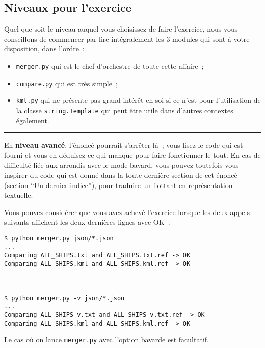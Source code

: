     \hypertarget{niveaux-pour-lexercice}{%
\subsection{Niveaux pour l'exercice}\label{niveaux-pour-lexercice}}

    Quel que soit le niveau auquel vous choisissez de faire l'exercice, nous
vous conseillons de commencer par lire intégralement les 3 modules qui
sont à votre disposition, dans l'ordre~:

\begin{itemize}
\tightlist
\item
  \texttt{merger.py} qui est le chef d'orchestre de toute cette
  affaire~;
\item
  \texttt{compare.py} qui est très simple~;
\item
  \texttt{kml.py} qui ne présente pas grand intérêt en soi si ce n'est
  pour l'utilisation de
  \href{https://docs.python.org/3/library/string.html\#template-strings}{la
  classe \texttt{string.Template}} qui peut être utile dans d'autres
  contextes également.
\end{itemize}

    \begin{center}\rule{0.5\linewidth}{\linethickness}\end{center}

    En \textbf{niveau avancé}, l'énoncé pourrait s'arrêter là~; vous lisez
le code qui est fourni et vous en déduisez ce qui manque pour faire
fonctionner le tout. En cas de difficulté liée aux arrondis avec le mode
bavard, vous pouvez toutefois vous inspirer du code qui est donné dans
la toute dernière section de cet énoncé (section ``Un dernier indice''),
pour traduire un flottant en représentation textuelle.

    Vous pouvez considérer que vous avez achevé l'exercice lorsque les deux
appels suivants affichent les deux dernières lignes avec OK~:

\begin{verbatim}
$ python merger.py json/*.json
...
Comparing ALL_SHIPS.txt and ALL_SHIPS.txt.ref -> OK
Comparing ALL_SHIPS.kml and ALL_SHIPS.kml.ref -> OK



$ python merger.py -v json/*.json
...
Comparing ALL_SHIPS-v.txt and ALL_SHIPS-v.txt.ref -> OK
Comparing ALL_SHIPS.kml and ALL_SHIPS.kml.ref -> OK
\end{verbatim}

    Le cas où on lance \texttt{merger.py} avec l'option bavarde est
facultatif.

